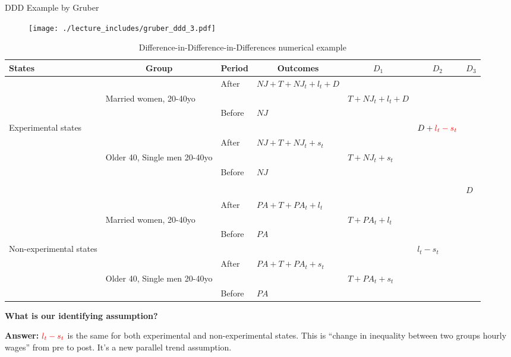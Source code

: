 \documentclass{beamer}
\begin{document}
\begin{frame}{DDD Example by Gruber}
	
	\begin{figure}
	\texttt{[image: ./lecture\_includes/gruber\_ddd\_3.pdf]}
	\end{figure}
	
\end{frame}



\begin{frame}[shrink=20]

\begin{table}\centering
		\caption{Difference-in-Difference-in-Differences numerical example}
		\tiny
		\begin{center}
		\begin{tabular}{lll|l|lll}
		\hline \hline
		\multicolumn{1}{l}{\textbf{States}}&
		\multicolumn{1}{c}{\textbf{Group}}&
		\multicolumn{1}{c}{\textbf{Period}}&
		\multicolumn{1}{c}{\textbf{Outcomes}}&
		\multicolumn{1}{c}{$D_1$}&
		\multicolumn{1}{c}{$D_2$}&
		\multicolumn{1}{c}{$D_3$}\\
		\hline
		&&After	&$NJ+T+NJ_t+l_t+D$					\\
	&Married women, 20-40yo			&&&$T+NJ_t+l_t+D$			\\
		&&Before	&$NJ$					\\
Experimental states					&&&&&$D+\textcolor{red}{l_t-s_t}$			\\
		&&After	&$NJ+T+NJ_t+s_t$					\\
	&Older 40, Single men 20-40yo		&&	&$T+NJ_t+s_t$				\\
		&&Before	&$NJ$					\\
								\\
&&&&&&$D$
\\
		&&After	&$PA+T+PA_t+l_t$				\\
	&Married women, 20-40yo			&&&$T+PA_t+l_t$ \\				
		&&Before	&$PA$					\\
Non-experimental states					&&&&&$l_t-s_t$		\\
		&&After	&$PA+T+PA_t+s_t$					\\
	&Older 40, Single men 20-40yo		&&&	$T+PA_t+s_t$				\\
		&&Before	&$PA$					\\
		\hline \hline
		\end{tabular}
		\end{center}
	\end{table}
	
\textbf{What is our identifying assumption?} 

\bigskip

\textbf{Answer:} $\textcolor{red}{l_t-s_t}$ is the same for both experimental and non-experimental states. This is ``change in inequality between two groups hourly wages'' from pre to post.  It's a new parallel trend assumption.



\end{frame}
\end{document}
